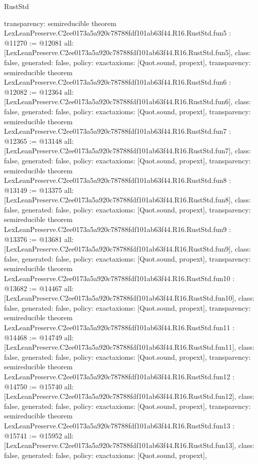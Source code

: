 \begin{lexlean}{RustStd}
\begin{coremodule}
{  transparency: semireducible
}
theorem LexLeanPreserve.C2ee0173a5a920c78788fdf101ab63f44.R16.RustStd.fun5 : @11270 := @12081 {
  all: [LexLeanPreserve.C2ee0173a5a920c78788fdf101ab63f44.R16.RustStd.fun5],
  class: false,
  generated: false,
  policy: exact{axioms: [Quot.sound, propext]},
  transparency: semireducible
}
theorem LexLeanPreserve.C2ee0173a5a920c78788fdf101ab63f44.R16.RustStd.fun6 : @12082 := @12364 {
  all: [LexLeanPreserve.C2ee0173a5a920c78788fdf101ab63f44.R16.RustStd.fun6],
  class: false,
  generated: false,
  policy: exact{axioms: [Quot.sound, propext]},
  transparency: semireducible
}
theorem LexLeanPreserve.C2ee0173a5a920c78788fdf101ab63f44.R16.RustStd.fun7 : @12365 := @13148 {
  all: [LexLeanPreserve.C2ee0173a5a920c78788fdf101ab63f44.R16.RustStd.fun7],
  class: false,
  generated: false,
  policy: exact{axioms: [Quot.sound, propext]},
  transparency: semireducible
}
theorem LexLeanPreserve.C2ee0173a5a920c78788fdf101ab63f44.R16.RustStd.fun8 : @13149 := @13375 {
  all: [LexLeanPreserve.C2ee0173a5a920c78788fdf101ab63f44.R16.RustStd.fun8],
  class: false,
  generated: false,
  policy: exact{axioms: [Quot.sound, propext]},
  transparency: semireducible
}
theorem LexLeanPreserve.C2ee0173a5a920c78788fdf101ab63f44.R16.RustStd.fun9 : @13376 := @13681 {
  all: [LexLeanPreserve.C2ee0173a5a920c78788fdf101ab63f44.R16.RustStd.fun9],
  class: false,
  generated: false,
  policy: exact{axioms: [Quot.sound, propext]},
  transparency: semireducible
}
theorem LexLeanPreserve.C2ee0173a5a920c78788fdf101ab63f44.R16.RustStd.fun10 : @13682 := @14467 {
  all: [LexLeanPreserve.C2ee0173a5a920c78788fdf101ab63f44.R16.RustStd.fun10],
  class: false,
  generated: false,
  policy: exact{axioms: [Quot.sound, propext]},
  transparency: semireducible
}
theorem LexLeanPreserve.C2ee0173a5a920c78788fdf101ab63f44.R16.RustStd.fun11 : @14468 := @14749 {
  all: [LexLeanPreserve.C2ee0173a5a920c78788fdf101ab63f44.R16.RustStd.fun11],
  class: false,
  generated: false,
  policy: exact{axioms: [Quot.sound, propext]},
  transparency: semireducible
}
theorem LexLeanPreserve.C2ee0173a5a920c78788fdf101ab63f44.R16.RustStd.fun12 : @14750 := @15740 {
  all: [LexLeanPreserve.C2ee0173a5a920c78788fdf101ab63f44.R16.RustStd.fun12],
  class: false,
  generated: false,
  policy: exact{axioms: [Quot.sound, propext]},
  transparency: semireducible
}
theorem LexLeanPreserve.C2ee0173a5a920c78788fdf101ab63f44.R16.RustStd.fun13 : @15741 := @15952 {
  all: [LexLeanPreserve.C2ee0173a5a920c78788fdf101ab63f44.R16.RustStd.fun13],
  class: false,
  generated: false,
  policy: exact{axioms: [Quot.sound, propext]},
}
\end{coremodule}
\end{lexlean}

